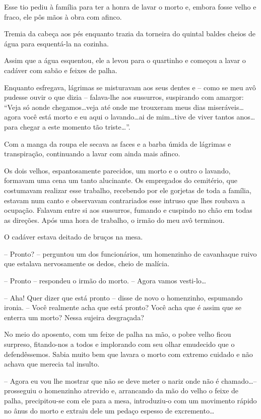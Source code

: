 Esse tio pediu à família para ter a honra de lavar o morto e, embora fosse velho e fraco, ele pôs mãos à obra com afinco.

Tremia da cabeça aos pés enquanto trazia da torneira do quintal baldes cheios de água para esquentá-la na cozinha.

Assim que a água esquentou, ele a levou para o quartinho e começou a lavar o cadáver com sabão e feixes de palha.

Enquanto esfregava, lágrimas se misturavam aos seus dentes e -- como se meu avô pudesse ouvir o que dizia -- falava-lhe aos sussurros, suspirando com amargor: ``Veja só aonde chegamos\dots veja até onde me trouxeram meus dias miseráveis\dots agora você está morto e eu aqui o lavando\dots ai de mim\dots tive de viver tantos anos\dots para chegar a este momento tão triste\dots''.

Com a manga da roupa ele secava as faces e a barba úmida de lágrimas e transpiração, continuando a lavar com ainda mais afinco.

Os dois velhos, espantosamente parecidos, um morto e o outro o lavando, formavam uma cena um tanto alucinante. Os empregados do cemitério, que costumavam realizar esse trabalho, recebendo por ele gorjetas de toda a família, estavam num canto e observavam contrariados esse intruso que lhes roubava a ocupação. Falavam entre si aos sussurros, fumando e cuspindo no chão em todas as direções. Após uma hora de trabalho, o irmão do meu avô terminou.

O cadáver estava deitado de bruços na mesa.

-- Pronto? -- perguntou um dos funcionários, um homenzinho de cavanhaque ruivo que estalava nervosamente os dedos, cheio de malícia.

-- Pronto -- respondeu o irmão do morto. -- Agora vamos vesti-lo\dots

-- Aha! Quer dizer que está pronto -- disse de novo o homenzinho, espumando ironia. -- Você realmente acha que está pronto? Você acha que é assim que se enterra um morto? Nessa 
sujeira desgraçada?

No meio do aposento, com um feixe de palha na mão, o pobre velho ficou surpreso, fitando-nos a todos e implorando com seu olhar emudecido que o defendêssemos. Sabia muito bem que lavara o morto com extremo cuidado e não achava que merecia tal insulto.

-- Agora eu vou lhe mostrar que não se deve meter o nariz onde não é chamado\dots -- prosseguiu o homenzinho atrevido e, arrancando da mão do velho o feixe de palha, precipitou-se com ele para a mesa, introduziu-o com um movimento rápido no ânus do morto e extraiu dele um pedaço espesso de excremento\dots

